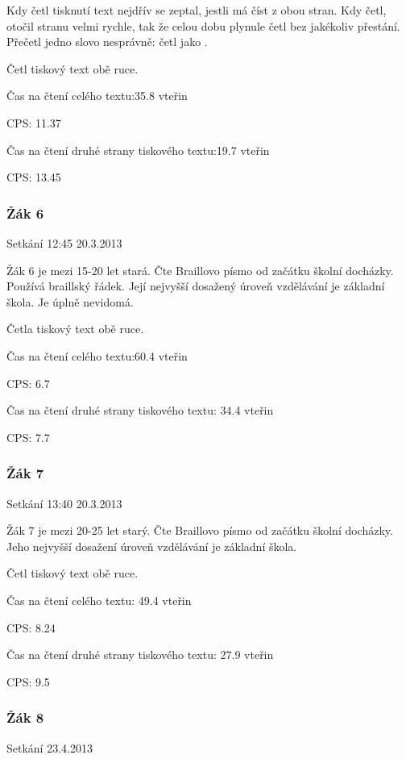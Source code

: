Kdy četl tisknutí text nejdřív se zeptal, jestli má číst z obou stran.  Kdy četl, otočil stranu velmi rychle, tak že celou dobu plynule četl bez jakékoliv přestání.  Přečetl jedno slovo nesprávně: četl  jako .

Četl tiskový text obě ruce.


Čas na čtení celého textu:35.8 vteřin

CPS: 11.37

Čas na čtení druhé strany tiskového textu:19.7 vteřin

CPS: 13.45

\subsubsection{Žák 6}
Setkání 12:45 20.3.2013

Žák 6 je mezi 15-20 let stará. Čte Braillovo písmo od začátku školní docházky. Používá braillský řádek. Její nejvyšší dosažený úroveň vzdělávání je základní škola.  Je úplně nevidomá.

Četla tiskový text obě ruce.


Čas na čtení celého textu:60.4 vteřin

CPS: 6.7

Čas na čtení druhé strany tiskového textu: 34.4 vteřin

CPS: 7.7

\subsubsection{Žák 7}
Setkání 13:40 20.3.2013

Žák 7 je mezi 20-25 let starý.  Čte Braillovo písmo od začátku školní docházky.  Jeho nejvyšší dosažení úroveň vzdělávání je základní škola.

Četl tiskový text obě ruce.


Čas na čtení celého textu: 49.4 vteřin

CPS: 8.24

Čas na čtení druhé strany tiskového textu: 27.9 vteřin

CPS: 9.5


\subsubsection{Žák 8}
Setkání 23.4.2013

